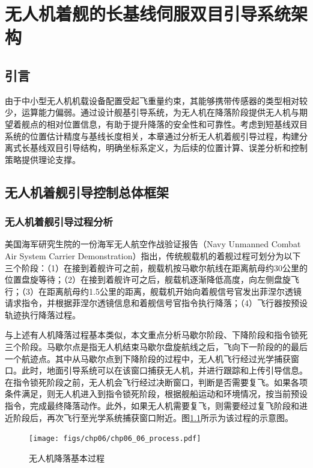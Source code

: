 \chapter{无人机着舰的长基线伺服双目引导系统架构}

\section{引言}
由于中小型无人机机载设备配置受起飞重量约束，其能够携带传感器的类型相对较少，运算能力偏弱。通过设计舰基引导系统，为无人机在降落阶段提供无人机与期望着舰点的相对位置信息，有助于提升降落的安全性和可靠性。考虑到短基线双目系统的位置估计精度与基线长度相关，本章通过分析无人机着舰引导过程，构建分离式长基线双目引导结构，明确坐标系定义，为后续的位置计算、误差分析和控制策略提供理论支撑。

\section{无人机着舰引导控制总体框架}
\subsection{无人机着舰引导过程分析}
美国海军研究生院的一份海军无人航空作战验证报告（Navy Unmanned Combat Air System Carrier Demonstration）\cite{UCASD_overview}指出，传统舰载机的着舰过程可划分为以下三个阶段：（1）在接到着舰许可之前，舰载机按马歇尔航线在距离航母约30公里的位置盘旋等待；（2）在接到着舰许可之后，舰载机逐渐降低高度，向左侧盘旋飞行；（3）在距离航母约1.5公里的距离，舰载机开始向着舰信号官发出菲涅尔透镜请求指令，并根据菲涅尔透镜信息和着舰信号官指令执行降落；（4）飞行器按预设轨迹执行降落过程。

与上述有人机降落过程基本类似，本文重点分析马歇尔阶段、下降阶段和指令锁死三个阶段。马歇尔点是指无人机结束马歇尔盘旋航线之后，飞向下一阶段的的最后一个航迹点。其中从马歇尔点到下降阶段的过程中，无人机飞行经过光学捕获窗口。此时，地面引导系统可以在该窗口捕获无人机，并进行跟踪和上传引导信息。在指令锁死阶段之前，无人机会飞行经过决断窗口，判断是否需要复飞。如果各项条件满足，则无人机进入到指令锁死阶段，根据舰船运动和环境情况，按当前预设指令，完成最终降落动作。此外，如果无人机需要复飞，则需要经过复飞阶段和进近阶段后，再次飞行至光学系统捕获窗口附近。图\ref{fig:chp06_06_process}所示为该过程的示意图。
\begin{figure}[!h]
	\centering
	\texttt{[image: figs/chp06/chp06\_06\_process.pdf]}	
	\caption{无人机降落基本过程}
	\label{fig:chp06_06_process}
\end{figure}

